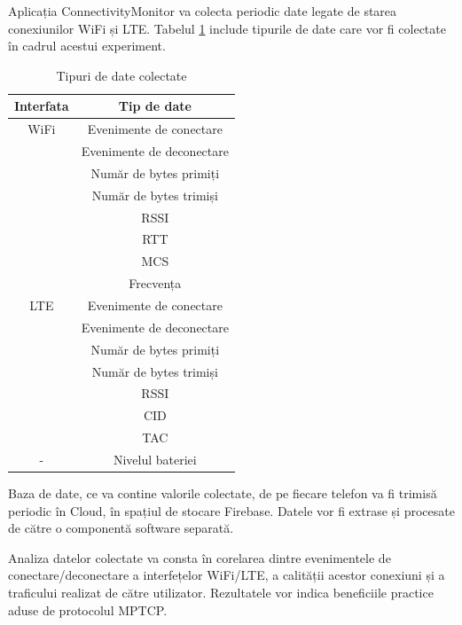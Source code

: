 Aplicația ConnectivityMonitor va colecta periodic date legate de starea conexiunilor WiFi și LTE. Tabelul \ref{tab:date} include tipurile de date care vor fi colectate în cadrul acestui experiment.

\begin{table}[h]
\centering
\caption{Tipuri de date colectate}
\label{tab:date}
\begin{tabular}{c | c}
\hline
Interfata & Tip de date  \\
\hline
WiFi & Evenimente de conectare \\
 & Evenimente de deconectare \\
 & Număr de bytes primiți \\
 & Număr de bytes trimiși \\
 & RSSI \\
 & RTT \\
 & MCS \\
 & Frecvența \\
\hline
LTE & Evenimente de conectare \\
 & Evenimente de deconectare \\
 & Număr de bytes primiți \\
 & Număr de bytes trimiși \\
 & RSSI \\
 & CID \\
 & TAC \\
\hline
- & Nivelul bateriei \\
\hline
\end{tabular}
\end{table}

Baza de date, ce va contine valorile colectate, de pe fiecare telefon va fi trimisă periodic în Cloud, în spațiul de stocare Firebase. Datele vor fi extrase și procesate de către o componentă software separată.

Analiza datelor colectate va consta în corelarea dintre evenimentele de conectare/deconectare a interfețelor WiFi/LTE, a calității acestor conexiuni și a traficului realizat de către utilizator. Rezultatele vor indica beneficiile practice aduse de protocolul MPTCP.


